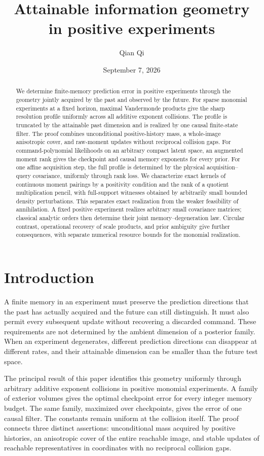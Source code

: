 \documentclass[11pt]{amsart}
\title[Attainable information geometry]{Attainable information geometry\\ in positive experiments}
\author{Qian Qi}
\date{September 7, 2026}
\theoremstyle{definition}\newtheorem{definition}[theorem]{Definition}
\theoremstyle{remark}\newtheorem{remark}[theorem]{Remark}
\begin{document}
\begin{abstract}
We determine finite-memory prediction error in positive experiments
through the geometry jointly acquired by the past and observed by the
future. For sparse monomial experiments at a fixed horizon, maximal
Vandermonde products give the sharp resolution profile uniformly across
all additive exponent collisions. The profile is truncated by the
attainable past dimension and is realized by one causal finite-state
filter. The proof combines unconditional positive-history mass, a
whole-image anisotropic cover, and raw-moment updates without reciprocal
collision gaps. For command-polynomial likelihoods on an arbitrary
compact latent space, an augmented moment rank gives the checkpoint and
causal memory exponents for every prior. For one affine acquisition
step, the full profile is determined by the physical acquisition--query
covariance, uniformly through rank loss. We characterize exact kernels
of continuous moment pairings by a positivity condition and the rank of
a quotient multiplication pencil, with full-support witnesses obtained
by arbitrarily small bounded density perturbations. This separates exact
realization from the weaker feasibility of annihilation. A fixed positive
experiment realizes arbitrary small covariance matrices; classical
analytic orders then determine their joint memory--degeneration law.
Circular contrast, operational recovery of scale products, and prior
ambiguity give further consequences, with separate numerical resource
bounds for the monomial realization.
\end{abstract}
\maketitle
\section{Introduction}
A finite memory in an experiment must preserve the prediction directions
that the past has actually acquired and the future can still distinguish.
It must also permit every subsequent update without recovering a
discarded command. These requirements are not determined by the
ambient dimension of a posterior family. When an experiment degenerates,
different prediction directions can disappear at different rates, and
their attainable dimension can be smaller than the future test space.

The principal result of this paper identifies this geometry uniformly
through arbitrary additive exponent collisions in positive monomial
experiments. A family of exterior volumes gives the optimal checkpoint
error for every integer memory budget. The same family, maximized over
checkpoints, gives the error of one causal filter. The constants remain
uniform at the collision itself. The proof connects three distinct
assertions: unconditional mass acquired by positive histories, an
anisotropic cover of the entire reachable image, and stable updates of
reachable representatives in coordinates with no reciprocal collision
gaps.
\end{document}
